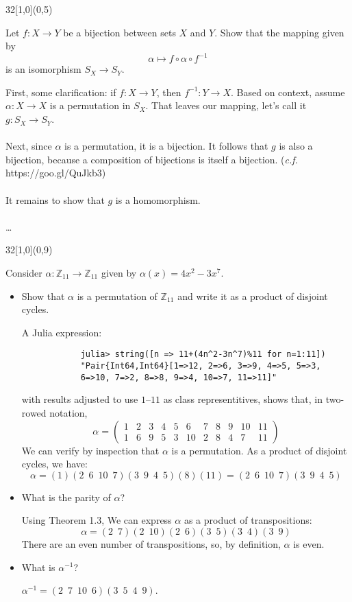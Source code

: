 \documentclass[12pt]{article}
\newcommand{\zee}{\mathbb{Z}}
\newenvironment{exercise}[2]{\begin{textblock}{32}[1,0](0,#2)\noindent#1\end{textblock}}{\vspace{1in}}
\begin{document}
\begin{exercise}{1.39}{5}
	{\noindent}Let $f : X\to Y$ be a bijection between sets $X$ and $Y$. Show that the mapping given by \[\alpha \mapsto f\circ\alpha\circ f^{-1}\] is an isomorphism $S_X\to S_Y$.
	\bigskip

	{\noindent}First, some clarification: if $f:X\to Y$, then $f^{-1}:Y\to X$. Based on context, assume $\alpha:X\to X$ is a permutation in $S_X$.
	That leaves our mapping, let's call it $g:S_X\to S_Y$.\\
	\\
	Next, since $\alpha$ is a permutation, it is a bijection. It follows that $g$ is also a bijection, because a composition of bijections is itself a bijection. ({\small{\textit{c.f.} https://goo.gl/QuJkb3}})\\
	\\
	It remains to show that $g$ is a homomorphism.\\
	\\
	\dots
\end{exercise}

\newpage

\begin{exercise}{1.29}{9}
	{\noindent}Consider $\alpha: \zee_{11}\to \zee_{11}$ given by $\alpha(x)=4x^2-3x^7$.
	\begin{itemize}
		\item Show that $\alpha$ is a permutation of $\zee_{11}$ and write it as a product of disjoint cycles.
		\bigskip

		A Julia expression:
		\begin{verbatim}
			julia> string([n => 11+(4n^2-3n^7)%11 for n=1:11])
			"Pair{Int64,Int64}[1=>12, 2=>6, 3=>9, 4=>5, 5=>3,
			6=>10, 7=>2, 8=>8, 9=>4, 10=>7, 11=>11]"
		\end{verbatim}
		with results adjusted to use $1$--$11$ as class representitives, shows that, in two-rowed notation,
		\[
		\alpha = \left(
			\begin{array}{rrrrrrrrrrr}
		    1 &  2 &  3 &  4 &  5 &  6 &  7 &  8 &  9 & 10 & 11 \\
		    1 &  6 &  9 &  5 &  3 & 10 &  2 &  8 &  4 &  7 & 11
		  \end{array}
			\right)
		\]
		We can verify by inspection that $\alpha$ is a permutation. As a product of disjoint cycles, we have:
		\[ \alpha = (1)(2\enspace6\enspace10\enspace7)(3\enspace9\enspace4\enspace5)(8)(11) = (2\enspace6\enspace10\enspace7)(3\enspace9\enspace4\enspace5) \]

		\item What is the parity of $\alpha$?
		\bigskip

		Using Theorem 1.3, We can express $\alpha$ as a product of transpositions:
		\[ \alpha = (2\enspace7)(2\enspace10)(2\enspace6)(3\enspace5)(3\enspace4)(3\enspace9) \]
		There are an even number of transpositions, so, by definition, $\alpha$ is even.

		\item What is $\alpha^{-1}$?
		\bigskip

		$\alpha^{-1}=(2\enspace7\enspace10\enspace6)(3\enspace5\enspace4\enspace9)$.
	\end{itemize}
\end{exercise}
\end{document}
